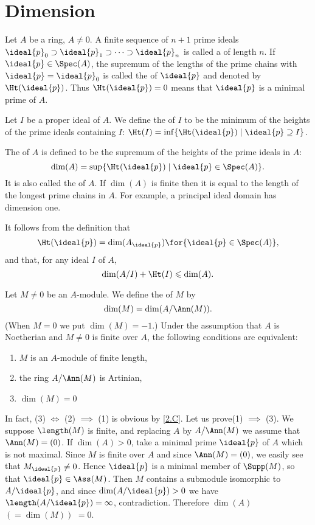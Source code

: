 \documentclass[../main]{subfiles}
\begin{document}
\section{Dimension}\label{sec:12}

\newparagraph
Let $A$ be a ring, $A \neq 0$. A finite sequence of $n+1$ prime ideals \newline $\ideal{p}_0 \supset \ideal{p}_1 \supset \cdots\supset\ideal{p}_n$ is called a  of length $n$. If $\ideal{p} \in \Spec(A)$, the supremum of the lengths of the prime chains with $\ideal{p}=\ideal{p}_0$ is called the  of $\ideal{p}$ and denoted by $\Ht(\ideal{p})$. Thus $\Ht(\ideal{p})=0$ means that $\ideal{p}$ is a minimal prime of $A$.

Let $I$ be a proper ideal of $A$. We define the  of $I$ to be the minimum of the heights of the prime ideals containing $I$: $\Ht(I)=\inf\{\Ht(\ideal{p}) \mid \ideal{p} \supseteq I\}$.

The  of $A$ is defined to be the supremum of the heights of the prime ideals in $A$: \[\dim(A)=\sup\{\Ht(\ideal{p}) \mid \ideal{p} \in \Spec(A)\}.\] It is also called the  of $A$. If $\dim(A)$ is finite then it is equal to the length of the longest prime chains in $A$. For example, a principal ideal domain has dimension one.

It follows from the definition that \[\Ht(\ideal{p})=\dim(A_{\ideal{p}}) \for{\ideal{p} \in \Spec(A)},\] and that, for any ideal $I$ of $A$, \[\dim(A/I)+\Ht(I)\leqslant\dim(A).\]

\newparagraph Let $M \neq 0$ be an $A$-module. We define the  of $M$ by \[\dim(M)=\dim(A/\Ann(M)).\] (When $M=0$ we put $\dim(M)=-1$.) Under the assumption that $A$ is Noetherian and $M \neq 0$ is finite over $A$, the following conditions are equivalent:
\begin{enumerate}[label=(\arabic*)]
    \item $M$ is an $A$-module of finite length,
    \item the ring $A/\Ann(M)$ is Artinian,
    \item $\dim(M)=0$
\end{enumerate}

In fact, (3) $\iff$ (2) $\implies$ (1) is obvious by \ref{2.C}. Let us prove\newline (1) $\implies$ (3). We suppose $\length(M)$ is finite, and replacing $A$ by $A/\Ann(M)$ we assume that $\Ann(M)=(0)$. If $\dim(A)>0$, take a minimal prime $\ideal{p}$ of $A$ which is not maximal. Since $M$ is finite over $A$ and since $\Ann(M)=(0)$, we easily see that $M_{\ideal{p}} \neq 0$. Hence $\ideal{p}$ is a minimal member of $\Supp(M)$, so that $\ideal{p} \in \Ass(M)$. Then $M$ contains a submodule isomorphic to $A / \ideal{p}$, and since $\dim(A / \ideal{p})>0$ we have $\length(A / \ideal{p})=\infty$, contradiction. Therefore $\dim(A)$ $(=\dim(M))$ $=0$.
\end{document}
